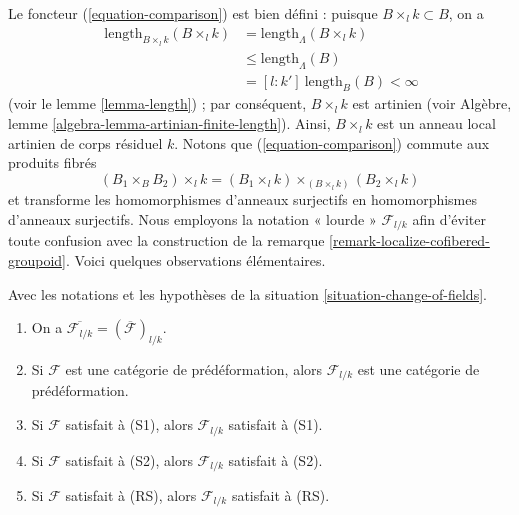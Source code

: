 \noindent
Le foncteur (\ref{equation-comparison}) est bien défini : puisque
$B \times_l k \subset B$, on a
\begin{align*}
[k : k']\ \text{length}_{B \times_l k}(B \times_l k) & =
\text{length}_\Lambda(B \times_l k) \\
& \leq \text{length}_\Lambda(B) \\
& = [l : k']\ \text{length}_B(B) < \infty
\end{align*}
(voir le lemme \ref{lemma-length}) ; par conséquent, $B \times_l k$ est
artinien (voir Algèbre, lemme
\ref{algebra-lemma-artinian-finite-length}). Ainsi, $B \times_l k$ est un
anneau local artinien de corps résiduel $k$. Notons que
(\ref{equation-comparison}) commute aux produits fibrés
$$
(B_1 \times_B B_2) \times_l k =
(B_1 \times_l k) \times_{(B \times_l k)} (B_2 \times_l k)
$$
et transforme les homomorphismes d'anneaux surjectifs en homomorphismes
d'anneaux surjectifs. Nous employons la notation « lourde »
$\mathcal{F}_{l/k}$ afin d'éviter toute confusion avec la construction de la
remarque \ref{remark-localize-cofibered-groupoid}. Voici quelques observations
élémentaires.

\begin{lemma}
\label{lemma-elementary-properties-change-of-field}
Avec les notations et les hypothèses de la situation
\ref{situation-change-of-fields}.
\begin{enumerate}
\item On a $\overline{\mathcal{F}_{l/k}} = (\overline{\mathcal{F}})_{l/k}$.
\item Si $\mathcal{F}$ est une catégorie de prédéformation, alors
$\mathcal{F}_{l/k}$ est une catégorie de prédéformation.
\item Si $\mathcal{F}$ satisfait à (S1), alors $\mathcal{F}_{l/k}$ satisfait à
(S1).
\item Si $\mathcal{F}$ satisfait à (S2), alors $\mathcal{F}_{l/k}$ satisfait à
(S2).
\item Si $\mathcal{F}$ satisfait à (RS), alors $\mathcal{F}_{l/k}$ satisfait à
(RS).
\end{enumerate}
\end{lemma}

